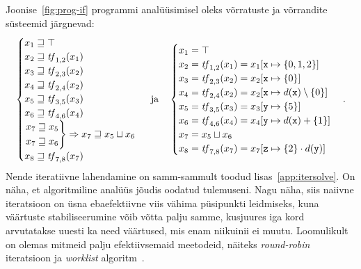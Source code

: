 \documentclass[../thesis.tex]{subfiles}
\begin{document}
Joonise~\ref{fig:prog-if} programmi analüüsimisel oleks võrratuste ja võrrandite süsteemid järgnevad:
\[
	\begin{cases}
		x_1 \sqgeq \top \\
		x_2 \sqgeq \tf_{1,2}(x_1) \\
		x_3 \sqgeq \tf_{2,3}(x_2) \\
		x_4 \sqgeq \tf_{2,4}(x_2) \\
		x_5 \sqgeq \tf_{3,5}(x_3) \\
		x_6 \sqgeq \tf_{4,6}(x_4) \\
		\begin{rcases*}
			x_7 \sqgeq x_5 \\
			x_7 \sqgeq x_6
		\end{rcases*} \Rightarrow x_7 \sqgeq x_5 \sqcup x_6 \\
		x_8 \sqgeq \tf_{7,8}(x_7)
	\end{cases}
	\  \text{ja} \quad
	\begin{cases}
		x_1 = \top \\
		x_2 = \tf_{1,2}(x_1) = x_1[\texttt{x} \mapsto \{0, 1, 2\}] \\
		x_3 = \tf_{2,3}(x_2) = x_2[\texttt{x} \mapsto \{0\}] \\
		x_4 = \tf_{2,4}(x_2) = x_2[\texttt{x} \mapsto d(\texttt{x}) \setminus \{0\}] \\
		x_5 = \tf_{3,5}(x_3) = x_3[\texttt{y} \mapsto \{5\}] \\
		x_6 = \tf_{4,6}(x_4) = x_4[\texttt{y} \mapsto d(\texttt{x}) + \{1\}] \\
		x_7 = x_5 \sqcup x_6 \\
		x_8 = \tf_{7,8}(x_7) = x_7[\texttt{z} \mapsto \{2\} \cdot d(\texttt{y})]
	\end{cases}.
\]
Nende iteratiivne lahendamine on samm-sammult toodud lisas~\ref{app:itersolve}.
On näha, et algoritmiline analüüs jõudis oodatud tulemuseni.
Nagu näha, siis naiivne iteratsioon on üsna ebaefektiivne viis vähima püsipunkti leidmiseks, kuna väärtuste stabiliseerumine võib võtta palju samme, kusjuures iga kord arvutatakse uuesti ka need väärtused, mis enam niikuinii ei muutu. Loomulikult on olemas mitmeid palju efektiivsemaid meetodeid, näiteks \textit{round-robin} iteratsioon ja \textit{worklist} algoritm~\cite[24,83]{seidl_foundations}.
\end{document}
